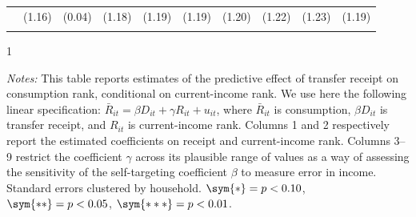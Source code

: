 \begin{table}[]
\begin{tabular*}{1.36\textwidth}{@{\extracolsep{\fill}}lccccccccc}
                   & (1.16)          & (0.04)          & (1.18)          & (1.19)          & (1.19)          & (1.20)          & (1.22)          & (1.23)          & (1.19)     \\
\addlinespace
\bottomrule
\end{tabular*}
\begin{spacing}{1}
\begin{tablenotes}
\item \footnotesize \textit{Notes:} This table reports estimates of
  the predictive effect of transfer receipt on consumption rank,
  conditional on current-income rank. We use here the following linear specification:
  $\bar{R}_{it}=\beta D_{it}+\gamma R_{it}+u_{it}$, where $\bar{R}_{it}$ is consumption, $\beta D_{it}$ is transfer receipt, and $R_{it}$ is current-income rank. Columns 1 and 2 respectively report the estimated coefficients on receipt and current-income rank. Columns 3--9
 restrict the coefficient $\gamma$ across its plausible range of values as a way of assessing the sensitivity of the self-targeting coefficient $\beta$ to measure error in income. Standard errors clustered by household. $\sym{*}=p<0.10$, $\sym{**}=p<0.05$, $\sym{***}=p<0.01$.
\end{tablenotes}
\end{spacing}
\end{table}
